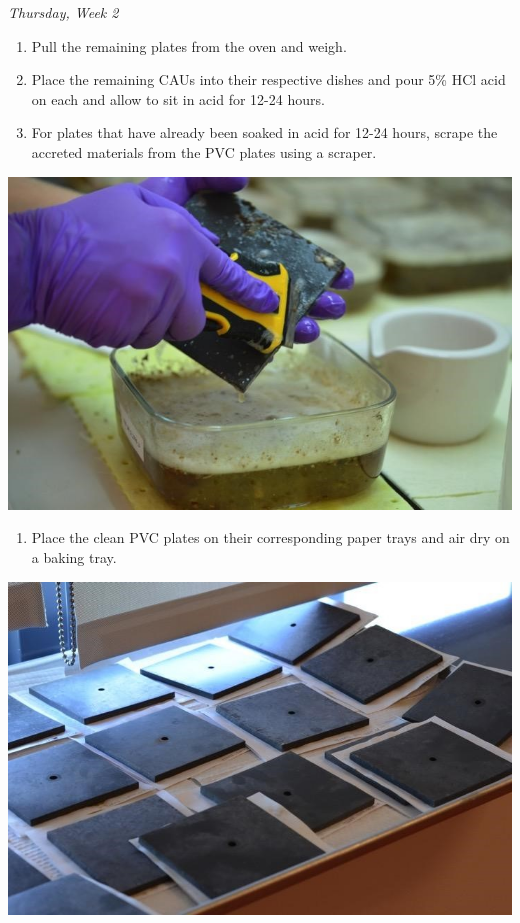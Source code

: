 \documentclass[]{book}
\providecommand{\tightlist}{%
  \setlength{\itemsep}{0pt}\setlength{\parskip}{0pt}}
\begin{document}
\emph{Thursday, Week 2}

\begin{enumerate}
\def\labelenumi{\arabic{enumi}.}
\tightlist
\item
  Pull the remaining plates from the oven and weigh.
\item
  Place the remaining CAUs into their respective dishes and pour 5\% HCl acid on each and allow to sit in acid for 12-24 hours.
\item
  For plates that have already been soaked in acid for 12-24 hours, scrape the accreted materials from the PVC plates using a scraper.
\end{enumerate}

\includegraphics{images/DailyTasks9.jpg}

\begin{enumerate}
\def\labelenumi{\arabic{enumi}.}
\setcounter{enumi}{3}
\tightlist
\item
  Place the clean PVC plates on their corresponding paper trays and air dry on a baking tray.
\end{enumerate}

\includegraphics{images/DailyTasks10.jpg}
\end{document}
